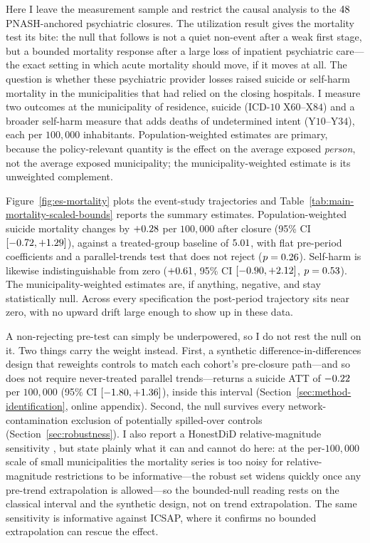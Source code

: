 Here I leave the measurement sample and restrict the causal analysis to
the $48$ PNASH-anchored psychiatric closures. The
utilization result gives the mortality test its bite: the null that follows
is not a quiet non-event after a weak first stage, but a bounded mortality
response after a large loss of inpatient psychiatric care---the exact
setting in which acute mortality should move, if it moves at all. The
question is whether these psychiatric provider losses raised suicide or
self-harm mortality in the municipalities that had relied on the closing
hospitals. I measure two outcomes at the municipality of residence,
suicide (ICD-$10$ X$60$--X$84$) and a broader self-harm measure that adds
deaths of undetermined intent (Y$10$--Y$34$), each per $100{,}000$
inhabitants. Population-weighted estimates are primary, because the
policy-relevant quantity is the effect on the average exposed
\emph{person}, not the average exposed municipality; the
municipality-weighted estimate is its unweighted complement.

Figure~\ref{fig:es-mortality} plots the event-study trajectories and
Table~\ref{tab:main-mortality-scaled-bounds} reports the summary
estimates. Population-weighted suicide mortality changes by
$+0.28$ per $100{,}000$ after closure (95\% CI $[-0.72,
+1.29]$), against a treated-group baseline of $5.01$,
with flat pre-period coefficients and a parallel-trends test that does
not reject ($p = 0.26$). Self-harm is likewise indistinguishable
from zero ($+0.61$, 95\% CI $[-0.90, +2.12]$, $p =
0.53$). The municipality-weighted estimates are, if anything,
negative, and stay statistically null. Across every specification the
post-period trajectory sits near zero, with no upward drift large enough
to show up in these data.

A non-rejecting pre-test can simply be underpowered, so I do not rest the
null on it. Two things carry the weight instead. First, a synthetic
difference-in-differences design that reweights controls to match each
cohort's pre-closure path---and so does not require never-treated parallel
trends---returns a suicide ATT of $-0.22$ per $100{,}000$ (95\% CI
$[-1.80, +1.36]$), inside this interval
(Section~\ref{sec:method-identification}, online appendix). Second, the null
survives every network-contamination exclusion of potentially spilled-over
controls (Section~\ref{sec:robustness}). I also report a HonestDiD
relative-magnitude sensitivity \citep{rambachanRoth2023}, but state plainly
what it can and cannot do here: at the per-$100{,}000$ scale of small
municipalities the mortality series is too noisy for relative-magnitude
restrictions to be informative---the robust set widens quickly once any
pre-trend extrapolation is allowed---so the bounded-null reading rests on
the classical interval and the synthetic design, not on trend
extrapolation. The same sensitivity is informative against ICSAP, where it
confirms no bounded extrapolation can rescue the effect.

